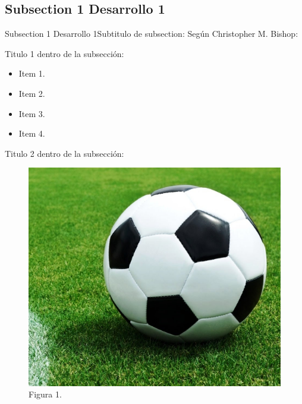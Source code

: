 \documentclass{beamer}
\begin{document}
\subsection{Subsection 1 Desarrollo 1}
\begin{frame}{Subsection 1 Desarrollo 1}{Subtitulo de subsection:}
Según Christopher M. Bishop\cite{C.Bishop}:
\vspace{0.5 cm}

\end{frame}


\begin{frame}{Titulo 1 dentro de la subsección:}
  \begin{itemize}
      \item Item 1.
      \item Item 2.
      \item Item 3.
      \item Item 4.
  \end{itemize}
\end{frame}


\begin{frame}{Titulo 2 dentro de la subsección:}
\begin{figure}
    \includegraphics[scale=0.2]{figura1.png}
    \caption{Figura 1.}
\end{figure}  
\end{frame}
\end{document}
